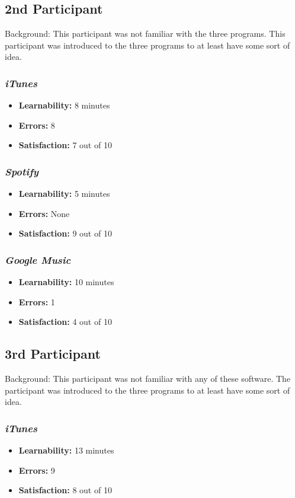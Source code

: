 \documentclass{article}
\begin{document}
{\begin{multicols}{2}
	
\subsection{2nd Participant}
Background: This participant was not familiar with the three programs. This participant was introduced to the three programs to at least have some sort of idea.

\subsubsection{\it iTunes}
\begin{itemize}
	\item {\bf Learnability:} 8 minutes
	\item {\bf Errors:} 8
	\item {\bf Satisfaction:} 7 out of 10 
\end{itemize}

\subsubsection{\it Spotify}
\begin{itemize}
	\item {\bf Learnability:} 5 minutes
	\item {\bf Errors:} None
	\item {\bf Satisfaction:} 9 out of 10 
\end{itemize}

\subsubsection{\it Google Music}
\begin{itemize}
\item {\bf Learnability:} 10 minutes
	\item {\bf Errors:} 1
	\item {\bf Satisfaction:} 4 out of 10 
\end{itemize}
	
\subsection{3rd Participant}
Background: This participant was not familiar with any of these software. The participant was introduced to the three programs to at least have some sort of idea.

\subsubsection{\it iTunes}
\begin{itemize}
	\item {\bf Learnability:} 13 minutes
	\item {\bf Errors:} 9
	\item {\bf Satisfaction:} 8 out of 10 
\end{itemize}


\end{multicols}}
\end{document}

